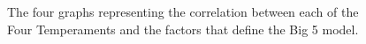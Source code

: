 \begin{figure}[ht!]
  \captionsetup{justification=centering}
    \caption{The four graphs representing the correlation between each of the Four Temperaments and the factors that define the Big 5 model.}
    \label{fig:4t-big5}
\end{figure}

